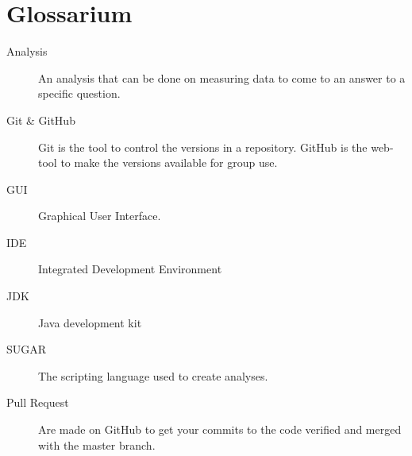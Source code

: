 \documentclass[a4paper]{article}
\begin{document}
\section{Glossarium}

\begin{description}

\item[Analysis] An analysis that can be done on measuring data to come to an answer to a specific question.
\item[Git \& GitHub] Git is the tool to control the versions in a repository. GitHub is the web-tool to make the versions available for group use.
\item[GUI] Graphical User Interface.
\item[IDE] Integrated Development Environment
\item[JDK] Java development kit
\item[SUGAR] The scripting language used to create analyses.
\item[Pull Request] Are made on GitHub to get your commits to the code verified and merged with the master branch.

\end{description}
\end{document}
